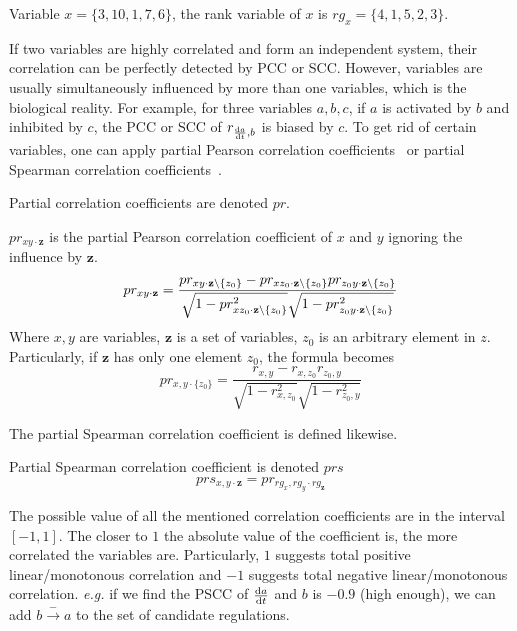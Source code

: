\begin{example}
Variable $x=\{3,10,1,7,6\}$, the rank variable of $x$ is $rg_x=\{4,1,5,2,3\}$.
\end{example}


If two variables are highly correlated and form an independent system, their correlation can be perfectly detected by PCC or SCC.
However, variables are usually simultaneously influenced by more than one variables, which is the biological reality.
For example, for three variables $a,b,c$, if $a$ is activated by $b$ and inhibited by $c$, the PCC or SCC of $r_{\frac{{\rm d}a}{{\rm d}t},b}$ is biased by $c$. 
To get rid of certain variables, one can apply partial Pearson correlation coefficients~\cite{baba2004partial} or partial Spearman correlation coefficients~\cite{borror2001practical}.

Partial correlation coefficients are denoted $pr$.

\begin{definition}\label{def:PPCC}
    $pr_{xy\cdot \mathbf {z}}$ is the partial Pearson correlation coefficient of $x$ and $y$ ignoring the influence by $\mathbf {z}$.
    $$pr _{xy\cdot \mathbf {z} }={\frac {pr _{xy\cdot \mathbf {z} \setminus\{z_{0}\}}-pr _{xz_{0}\cdot \mathbf {z} \setminus\{z_{0}\}}pr _{z_{0}y\cdot \mathbf {z} \setminus\{z_{0}\}}}{{\sqrt {1-pr _{xz_{0}\cdot \mathbf {z} \setminus\{z_{0}\}}^{2}}}{\sqrt {1-pr _{z_{0}y\cdot \mathbf {z} \setminus\{z_{0}\}}^{2}}}}}$$
    Where $x,y$ are variables, $\mathbf {z}$ is a set of variables, $z_0$ is an arbitrary element in $z$. 
    Particularly, if $\mathbf {z}$ has only one element $z_0$, the formula becomes
    $$pr_{x,y\cdot \{z_0\}}={\frac {r _{x,y}-r _{x,z_0}r _{z_0,y}}{{\sqrt {1-r _{x,z_0}^{2}}}{\sqrt {1-r _{z_0,y}^{2}}}}}$$

\end{definition}

The partial Spearman correlation coefficient is defined likewise.
\begin{definition}\label{def:PSCC}
Partial Spearman correlation coefficient is denoted $prs$
    $$prs_{x,y\cdot \mathbf {z}}=pr_{rg_x,rg_y\cdot rg_\mathbf {z}}$$%
\end{definition}

The possible value of all the mentioned correlation coefficients are in the interval $[-1,1]$.
The closer to $1$ the absolute value of the coefficient is, the more correlated the variables are.
Particularly, $1$ suggests total positive linear/monotonous correlation and $-1$ suggests total negative linear/monotonous correlation. 
\textit{e.g.} if we find the PSCC of $\frac{{\rm d}a}{{\rm d}t}$ and $b$ is $-0.9$ (high enough), we can add $b\xrightarrow{-}a$ to the set of candidate regulations.

